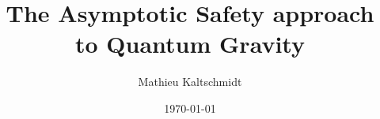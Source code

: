 \title{The Asymptotic Safety approach to Quantum Gravity}
\author{Mathieu Kaltschmidt}
\date{\today}

\newtheorem{statements}{Statements}[chapter]

\usepackage{fancyhdr}
\fancyhfoffset{0pt}

\usepackage[a4paper,
			width = 150mm,
			top = 30mm,
		    bottom=30mm%
		    ]{geometry}
\usepackage[onehalfspacing]{setspace}


\renewcommand{\chaptermark}[1]{
    \markboth{\mbox{\@chapapp}\ \thechapter.\ \ #1}{}%
}
\renewcommand{\sectionmark}[1]{
    \markright{\thesection\ \ #1}{}
}

\renewcommand*\raggedchapter{\centering}
\renewcommand*{\chapterformat}{%
  \chapappifchapterprefix{\nobreakspace}\thechapter\autodot%
  \IfUsePrefixLine{%
    \par\nobreak\vspace{-\parskip}\vspace{-.6\baselineskip}%
    \rule{0.9\textwidth}{0.5pt}\vspace{-1\baselineskip}%
  }{\enskip}%
}
\renewcommand\chapterlineswithprefixformat[3]{%
#2#3
}



\pagestyle{fancy}
	\fancyhf{}
	\fancyhead[LE]{\footnotesize\nouppercase{\leftmark}}
	\fancyhead[RO]{\footnotesize\nouppercase{\rightmark}}
	\fancyfoot[C]{\thepage}
	\renewcommand{\headrulewidth}{0.2pt}
	\renewcommand{\footrulewidth}{0pt}



\usepackage{amsmath, amssymb, commath, mathtools}
\usepackage{physics}
\usepackage{slashed}
\usepackage[hyperref]{ntheorem}
\usepackage{xfrac}
\usepackage[separate-uncertainty]{siunitx}


\usepackage{array} %
\usepackage{booktabs} %

